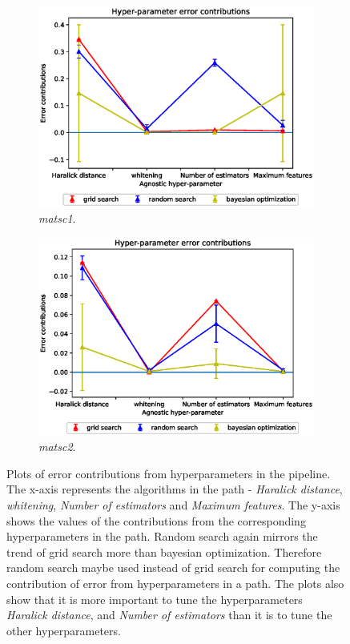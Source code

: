 \begin{figure}[ht!]
\begin{subfigure}{.5\textwidth}
  \includegraphics[scale=0.37]{img/EP/agnostic_error_hyper_matsc_dataset1.eps}
  \caption{\textit{matsc1}.}
  \label{fig:eq_hyper_matsc1}
\end{subfigure}%
\begin{subfigure}{.5\textwidth}
  \centering
  \includegraphics[scale=0.37]{img/EP/agnostic_error_hyper_matsc_dataset2.eps}
  \caption{\textit{matsc2}.}
  \label{fig:eq_hyper_matsc2}
\end{subfigure}

\caption{Plots of error contributions from hyperparameters in the pipeline. The x-axis represents the algorithms in the path - \textit{Haralick distance}, \textit{whitening}, \textit{Number of estimators} and \textit{Maximum features}. The y-axis shows the values of the contributions from the corresponding hyperparameters in the path. Random search again mirrors the trend of grid search more than bayesian optimization. Therefore random search maybe used instead of grid search for computing the contribution of error from hyperparameters in a path. The plots also show that it is more important to tune the hyperparameters \textit{Haralick distance}, and \textit{Number of estimators} than it is to tune  the other hyperparameters.}
\label{fig:eq_hyper}
\end{figure}
